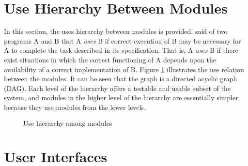 \documentclass[12pt, titlepage]{article}
\begin{document}
\section{Use Hierarchy Between Modules} \label{SecUse}

In this section, the uses hierarchy between modules is
provided. \citet{Parnas1978} said of two programs A and B that A {\em uses} B if
correct execution of B may be necessary for A to complete the task described in
its specification. That is, A {\em uses} B if there exist situations in which
the correct functioning of A depends upon the availability of a correct
implementation of B.  Figure \ref{FigUH} illustrates the use relation between
the modules. It can be seen that the graph is a directed acyclic graph
(DAG). Each level of the hierarchy offers a testable and usable subset of the
system, and modules in the higher level of the hierarchy are essentially simpler
because they use modules from the lower levels.



\begin{figure}[H]
\centering
\caption{Use hierarchy among modules}
\label{FigUH}
\end{figure}


\newpage
\section{User Interfaces}

\end{document}
